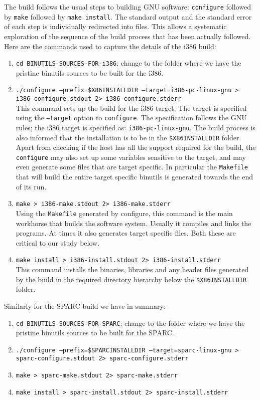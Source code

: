The  build   follows  the  usual  steps  to   building  GNU  software:
\texttt{configure} followed by  \texttt{make} followed by \texttt{make
  install}.  The standard  output and the standard error  of each step
is  individually  redirected into  files.   This  allows a  systematic
exploration  of  the sequence  of  the  build  process that  has  been
actually followed.  Here are the commands used to capture the details
of the i386 build:
\begin{enumerate}[noitemsep]
\item  \texttt{cd  BINUTILS-SOURCES-FOR-i386}:  change to  the  folder
  where  we have the  pristine binutils  sources to  be built  for the
  i386.
\item           \texttt{./configure           --prefix=\$X86INSTALLDIR
    --target=i386-pc-linux-gnu > i386-configure.stdout 2>
    i386-configure.stderr} \\
  This command sets  up the build for the i386  target.  The target is
  specified using the  \texttt{--target} option to \texttt{configure}.
  The  specification  follows  the  GNU  rules;  the  i386  target  is
  specified as: \texttt{i386-pc-linux-gnu}.  The build process is also
  informed    that    the   installation    is    to    be   in    the
  \texttt{\$X86INSTALLDIR}  folder.  Apart from  checking if  the host
  has all  the support required for the  build, the \texttt{configure}
  may also set up some variables sensitive to the target, and may even
  generate  some files that  are target  specific.  In  particular the
  \texttt{Makefile}  that  will   build  the  entire  target  specific
  binutils is generated towards the end of its run.
\item \texttt{make > i386-make.stdout 2> i386-make.stderr} \\
  Using the \texttt{Makefile} generated  by configure, this command is
  the  main workhorse  that builds  the software  system.   Usually it
  compiles and links the programs.   At times it also generates target
  specific files.  Both these are critical to our study below.
\item \texttt{make install > i386-install.stdout 2>
    i386-install.stderr} \\
  This command  installs the binaries, libraries and  any header files
  generated by the build in the required directory hierarchy below the
  \texttt{\$X86INSTALLDIR} folder.
\end{enumerate}
Similarly for the SPARC build we have in summary:
\begin{enumerate}[noitemsep]
\item  \texttt{cd BINUTILS-SOURCES-FOR-SPARC}:  change  to the  folder
  where  we have the  pristine binutils  sources to  be built  for the
  SPARC.
\item \texttt{./configure --prefix=\$SPARCINSTALLDIR
    --target=sparc-linux-gnu > sparc-configure.stdout 2> sparc-configure.stderr} 
\item \texttt{make > sparc-make.stdout 2> sparc-make.stderr} 
\item \texttt{make install > sparc-install.stdout 2> sparc-install.stderr} 
\end{enumerate}

